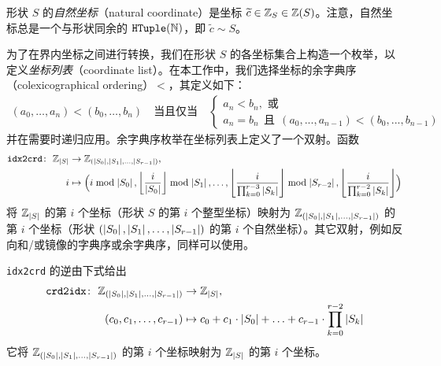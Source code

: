 \begin{definition}
形状 $S$ 的\emph{自然坐标}（natural coordinate）是坐标 $\widetilde{c} \in \mathbb{Z}_S \in \mathbb{Z}(S)$。注意，自然坐标总是一个与形状同余的 $\texttt{HTuple}(\mathbb{N})$，即 $\tilde{c} \sim S$。
\end{definition}

为了在界内坐标之间进行转换，我们在形状 $S$ 的各坐标集合上构造一个枚举，以定义{\em 坐标列表}（coordinate list）。在本工作中，我们选择坐标的余字典序（colexicographical ordering）$<$，其定义如下：
\begin{align*}
(a_0, \ldots, a_n) < (b_0, \ldots, b_n)
\quad \text{当且仅当} \quad
\begin{cases}
    a_n < b_n, \text{ 或} \\
    a_n = b_n \ \ \text{且} \ \ (a_0,...,a_{n-1}) < (b_0,...,b_{n-1})
\end{cases}
\end{align*}
并在需要时递归应用。余字典序枚举在坐标列表上定义了一个双射。函数
\begin{align}
\texttt{idx2crd} \colon \ \mathbb{Z}_{\left| {S} \right|} &\to \mathbb{Z}_{(\left| {S_0} \right|, \left| {S_1} \right|, \ldots, \left| {S_{r-1}} \right|)}, \nonumber \\
i &\mapsto \Bigl(i \bmod \left| {S_0} \right|, \left\lfloor {\frac{i}{\left| {S_0} \right|}} \right\rfloor \bmod \left| {S_1} \right|, \ldots, \left\lfloor {\frac{i}{\prod_{k=0}^{r-3} \left| {S_k} \right|}} \right\rfloor \bmod \left| {S_{r-2}} \right|, \left\lfloor {\frac{i}{\prod_{k=0}^{r-2} \left| {S_k} \right|}} \right\rfloor \Bigr)
\label{eqn:idx2crd}
\end{align}
将 $\mathbb{Z}_{\left| {S} \right|}$ 的第 $i$ 个坐标（形状 $S$ 的第 $i$ 个整型坐标）映射为 $\mathbb{Z}_{(\left| {S_0} \right|, \left| {S_1} \right|, \ldots, \left| {S_{r-1}} \right|)}$ 的第 $i$ 个坐标（形状 $(\left| {S_0} \right|, \left| {S_1} \right|, \ldots, \left| {S_{r-1}} \right|)$ 的第 $i$ 个自然坐标）。其它双射，例如反向和/或镜像的字典序或余字典序，同样可以使用。

\texttt{idx2crd} 的逆由下式给出
\begin{align}
\texttt{crd2idx} \colon \ \mathbb{Z}_{(\left| {S_0} \right|, \left| {S_1} \right|, \ldots, \left| {S_{r-1}} \right|)} &\to \mathbb{Z}_{\left| {S} \right|}, \nonumber \\
(c_0, c_1, \ldots, c_{r-1}) &\mapsto c_0 + c_1 \cdot \left| {S_0} \right| + \ldots + c_{r-1} \cdot \prod_{k=0}^{r-2} \left| {S_k} \right|
\label{eqn:crd2idx}
\end{align}
它将 $\mathbb{Z}_{(\left| {S_0} \right|, \left| {S_1} \right|, \ldots, \left| {S_{r-1}} \right|)}$ 的第 $i$ 个坐标映射为 $\mathbb{Z}_{\left| {S} \right|}$ 的第 $i$ 个坐标。

